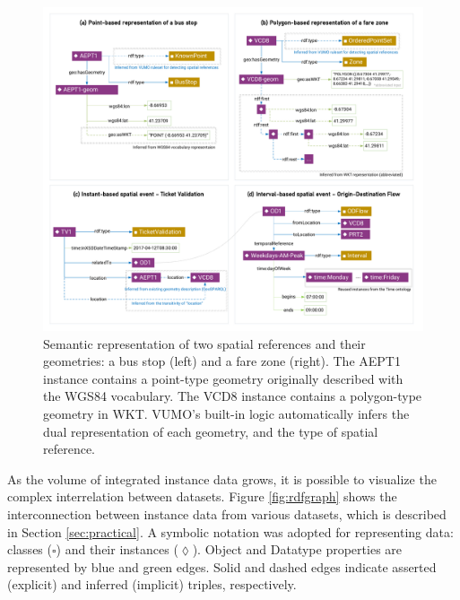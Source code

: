 \documentclass[]{interact}
\theoremstyle{plain}%
\theoremstyle{definition}
\theoremstyle{remark}
\theoremstyle{definition}
\begin{document}
\begin{figure}[htbp]
	\centering
	\includegraphics[width=\linewidth]{images/umc_spatialtemporalreferences_exemplos.pdf}
	\caption{Semantic representation of two spatial references and their geometries: a bus stop (left) and a fare zone (right). The AEPT1 instance contains a point-type geometry originally described with the WGS84 vocabulary. The VCD8 instance contains a polygon-type geometry in WKT. VUMO's built-in logic automatically infers the dual representation of each geometry, and the type of spatial reference.}
	\label{fig:umc_spatialtemporalreferences_exemplos}
\end{figure}

As the volume of integrated instance data grows, it is possible to visualize the complex interrelation between datasets. Figure \ref{fig:rdfgraph} shows the interconnection between instance data from various datasets, which is described in Section \ref{sec:practical}. A symbolic notation was adopted for representing data: classes ($\square$) and their instances ($\lozenge$). Object and Datatype properties are represented by blue and green edges. Solid and dashed edges indicate asserted (explicit) and inferred (implicit) triples, respectively.
\end{document}
